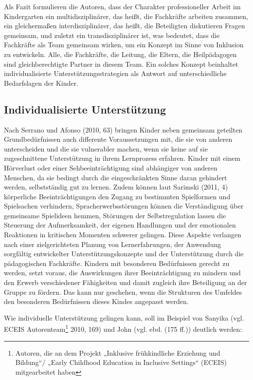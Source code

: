 Als Fazit formulieren die Autoren, dass der Charakter professioneller Arbeit im Kindergarten ein multidisziplinärer, das heißt, die Fachkräfte arbeiten zusammen, ein gleichermaßen interdisziplinärer, das heißt, die Beteiligten diskutieren Fragen gemeinsam, und zuletzt ein transdisziplinärer ist, was bedeutet, dass die Fachkräfte als Team gemeinsam wirken, um ein Konzept im Sinne von Inklusion zu entwickeln. Alle, die Fachkräfte, die Leitung, die Eltern, die Heilpädagogen sind gleichberechtigte Partner in diesem Team.  
Ein solches Konzept beinhaltet individualisierte Unterstützungsstrategien als Antwort auf unterschiedliche Bedarfslagen der Kinder.  

\subsection{Individualisierte Unterstützung} 
\label{Individualisierung}
Nach Serrano und Afonso (2010, 63) bringen Kinder neben gemeinsam geteilten Grundbedürfnissen auch differente Voraussetzungen mit, die sie von anderen unterscheiden und die sie vulnerabler machen, wenn sie keine auf sie zugeschnittene Unterstützung in ihrem Lernprozess erfahren. Kinder mit einem Hörverlust oder einer Sehbeeinträchtigung sind abhängiger von anderen Menschen, da sie bedingt durch die eingeschränkten Sinne daran gehindert werden, selbstständig gut zu lernen. Zudem können laut Sarimski (2011, 4) körperliche Beeinträchtigungen den Zugang zu bestimmten Spielformen und Spielsachen verhindern, Spracherwerbsstörungen können die Verständigung über gemeinsame Spielideen hemmen, Störungen der Selbstregulation lassen die Steuerung der Aufmerksamkeit, der eigenen Handlungen und der emotionalen Reaktionen in kritischen Momenten schwerer gelingen.    
Diese Aspekte verlangen nach einer zielgerichteten Planung von Lernerfahrungen, der Anwendung sorgfältig entwickelter Unterstützungskonzepte und der Unterstützung durch die pädagogischen Fachkräfte. Kindern mit besonderen Bedürfnissen gerecht zu werden, setzt voraus, die Auswirkungen ihrer Beeinträchtigung zu mindern und den Erwerb verschiedener Fähigkeiten und damit zugleich ihre Beteiligung an der Gruppe zu fördern. Das kann nur geschehen, wenn die Strukturen des Umfeldes den besonderen Bedürfnissen dieses Kindes angepasst werden. 

Wie individuelle Unterstützung gelingen kann, soll im Beispiel von Sanyika (vgl. ECEIS Autorenteam\footnote{Autoren, die an dem Projekt „Inklusive frühkindliche Erziehung und Bildung“/ „Early Childhood Education in Inclusive Settings“ (ECEIS) mitgearbeitet haben} 2010, 169) und John (vgl. ebd. (175 ff.)) deutlich werden:

